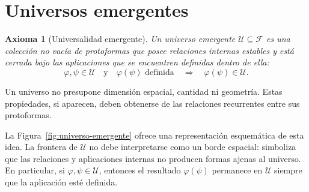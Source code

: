 \documentclass[11pt]{article}
\numberwithin{equation}{section}
\theoremstyle{prism}
\newtheorem{axioma}{Axioma}
\newcommand{\F}{\mathcal{F}}
\newcommand{\U}{\mathcal{U}}
\begin{document}
\FloatBarrier
\section{Universos emergentes}

\begin{axioma}[Universalidad emergente]
Un universo emergente $\U\subseteq\F$ es una colección no vacía de
protoformas que posee relaciones internas estables y está cerrada bajo las
aplicaciones que se encuentren definidas dentro de ella:
\begin{equation}
  \varphi,\psi\in\U
  \quad\text{y}\quad
  \varphi(\psi)\text{ definida}
  \quad\Longrightarrow\quad
  \varphi(\psi)\in\U.
  \label{eq:universo}
\end{equation}
\end{axioma}

Un universo no presupone dimensión espacial, cantidad ni geometría. Estas
propiedades, si aparecen, deben obtenerse de las relaciones recurrentes entre
sus protoformas.

La Figura~\ref{fig:universo-emergente} ofrece una representación esquemática de
esta idea. La frontera de $\U$ no debe interpretarse como un borde espacial:
simboliza que las relaciones y aplicaciones internas no producen formas ajenas
al universo. En particular, si $\varphi,\psi\in\U$, entonces el resultado
$\varphi(\psi)$ permanece en $\U$ siempre que la aplicación esté definida.
\end{document}

